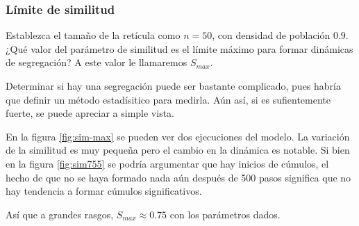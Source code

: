 \documentclass{article}
\begin{document}
\subsubsection{Límite de similitud}

Establezca el tamaño de la retícula como $n = 50$, con densidad de población
$0.9$.
¿Qué valor del parámetro de similitud es el límite máximo para formar dinámicas
de segregación?
A este valor le llamaremos $S_{max}$.

Determinar si hay una segregación puede ser bastante complicado, pues habría que
definir un método estadísitico para medirla. Aún así, si es sufientemente
fuerte, se puede apreciar a simple vista.

En la figura \ref{fig:sim-max} se pueden ver dos ejecuciones del modelo. La
variación de la similitud es muy pequeña pero el cambio en la dinámica es
notable. Si bien en la figura \ref{fig:sim755} se podría argumentar que hay
inicios de cúmulos, el hecho de que no se haya formado nada aún después de 500
pasos significa que no hay tendencia a formar cúmulos significativos.

Así que a grandes rasgos, $S_{max} \approx 0.75$ con los parámetros dados.
\end{document}
